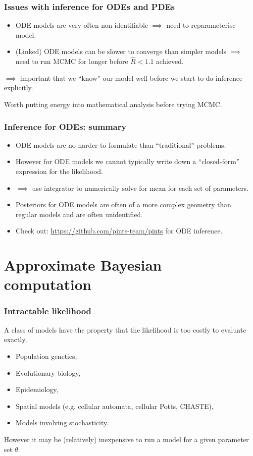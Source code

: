 \documentclass[handout]{beamer}
\begin{document}
\begin{frame}
	\frametitle{Issues with inference for ODEs and PDEs}
	\begin{itemize}
		\item<2-> ODE models are very often non-identifiable $\implies$ need to reparameterise model.
		\item<3-> (Linked) ODE models can be slower to converge than simpler models $\implies$ need to run MCMC for longer before $\hat{R}<1.1$ achieved.
	\end{itemize}
	
	$\implies$ important that we ``know'' our model well before we start to do inference explicitly.
	
	 Worth putting energy into mathematical analysis before trying MCMC. 
	
\end{frame}


\begin{frame}
	\frametitle{Inference for ODEs: summary}
	\begin{itemize}
		\item<2-> ODE models are no harder to formulate than ``traditional'' problems.
		\item<3-> However for ODE models we cannot typically write down a ``closed-form'' expression for the likelihood.
		\item<4-> $\implies$ use integrator to numerically solve for mean for each set of parameters.
		\item<5-> Posteriors for ODE models are often of a more complex geometry than regular models and are often unidentified.
		\item<6-> Check out: \url{https://github.com/pints-team/pints} for ODE inference.
	\end{itemize}
	
\end{frame}


\section{Approximate Bayesian computation}
\frame{\tableofcontents[currentsection]}

\begin{frame}
	\frametitle{Intractable likelihood}
	A class of models have the property that the likelihood is too costly to evaluate exactly,
	
	\begin{itemize}
		\item<2-> Population genetics,
		\item<3-> Evolutionary biology,
		\item<4-> Epidemiology,
		\item<5-> Spatial models (e.g. cellular automata, cellular Potts, CHASTE),
		\item<6-> Models involving stochasticity.
	\end{itemize}
	
	 However it may be (relatively) inexpensive to run a model for a given parameter set $\theta$.
	
\end{frame}
\end{document}
